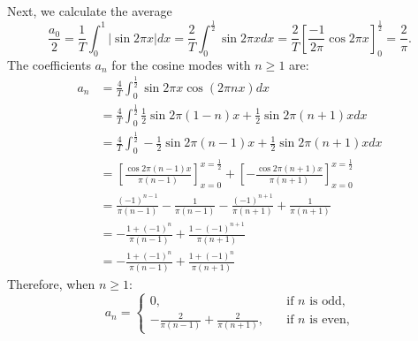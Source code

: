 \documentclass[11pt]{article}
\begin{document}
\begin{solution}
\begin{itemize}
        
        Next, we calculate the average 
        \[
            \frac{a_0}{2}
            = 
            \frac{1}{T} \int_{0}^{1} |\sin 2\pi x| dx  
            = 
            \frac{2}{T} \int_{0}^{\frac 1 2} \sin 2\pi x dx  
            =  
            \frac 2 T
            \left[ \frac{-1}{2\pi} \cos{2\pi x} \right]_{0}^{\frac 1 2} 
            =
            \frac{2}{\pi} 
            .
        \]
        The coefficients $a_n$ for the cosine modes with $n \geq 1$ are:
        \begin{align*}
            a_n 
            &
            = 
            \frac{4}{T}
            \int_{0}^{\frac 1 2} \sin 2\pi x \cos(2\pi n x) dx
            \\&
            =
            \frac{4}{T}
            \int_{0}^{\frac 1 2} \frac 1 2 \sin{2\pi(1-n)x} + \frac 1 2 \sin{2\pi(n+1)x} dx
            \\&
		=
            \frac{4}{T}
            \int_{0}^{\frac 1 2} -\frac 1 2 \sin{2\pi(n-1)x} + \frac 1 2 \sin{2\pi(n+1)x} dx
            \\&
            =
            \left[\frac{ \cos2\pi(n-1)x }{ \pi(n-1) } \right]_{x=0}^{x=\frac 1 2}
            +
            \left[- \frac{ \cos2\pi(n+1)x }{ \pi(n+1) } \right]_{x=0}^{x=\frac 1 2}
            \\&
            = 
            \frac{(-1)^{n-1}}{\pi(n-1)} -  \frac{1}{\pi(n-1)}  - \frac{(-1)^{n+1}}{\pi(n+1)} + \frac{1}{\pi(n+1)}
            \\&
            = -\frac{1+(-1)^{n}}{\pi(n-1)} +  \frac{1-(-1)^{n+1}}{\pi(n+1)} 
            \\&
            = -\frac{1+(-1)^{n}}{\pi(n-1)} +  \frac{1+(-1)^{n}}{\pi(n+1)} 
        \end{align*}	
        Therefore, when $n \geq 1$:
        \[a_n = 
        \begin{cases}
        0 ,\quad &\text{if } n\text{ is odd,}\\
        -\frac{2}{\pi(n-1)} + \frac{2}{\pi(n+1)}  ,\quad &\text{if } n\text{ is even,}
        \end{cases}
        \]
       \end{itemize}
\end{solution}
\end{document}

